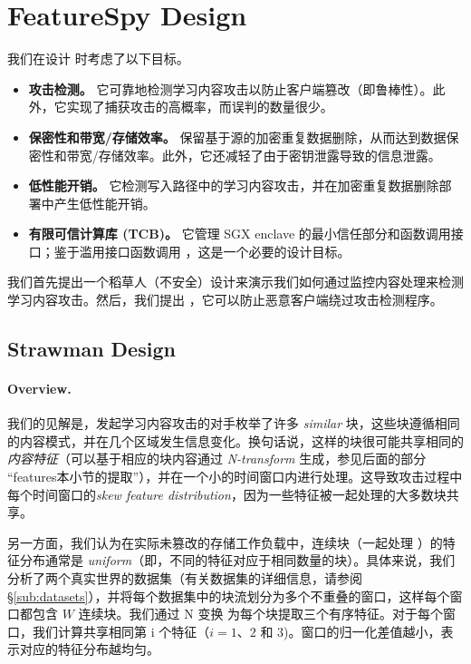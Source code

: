 \section{FeatureSpy Design}
\label{sec:design}
我们在设计 \sysnameF 时考虑了以下目标。

\begin{itemize}[leftmargin=*]
\item {\bf 攻击检测。} 它可靠地检测学习内容攻击以防止客户端篡改（即鲁棒性）。此外，它实现了捕获攻击的高概率，而误判的数量很少。
\item {\bf 保密性和带宽/存储效率。} 保留基于源的加密重复数据删除，从而达到数据保密性和带宽/存储效率。此外，它还减轻了由于密钥泄露导致的信息泄露。
\item {\bf 低性能开销。} 它检测写入路径中的学习内容攻击，并在加密重复数据删除部署中产生低性能开销。
\item {\bf 有限可信计算库 (TCB)。} 它管理 SGX enclave 的最小信任部分和函数调用接口；鉴于滥用接口函数调用 \cite{lie05}，这是一个必要的设计目标。
\end{itemize}

我们首先提出一个稻草人（不安全）设计来演示我们如何通过监控内容处理来检测学习内容攻击。然后，我们提出 \sysnameF，它可以防止恶意客户端绕过攻击检测程序。


\subsection{Strawman Design}
\label{sub:basic}
\paragraph{Overview.} 我们的见解是，发起学习内容攻击的对手枚举了许多 {\em similar} 块，这些块遵循相同的内容模式，并在几个区域发生信息变化。换句话说，这样的块很可能共享相同的 {\em 内容特征}（可以基于相应的块内容通过 {\em N-transform} \cite{shilane12} 生成，参见后面的部分 “features本小节的提取”），并在一个小的时间窗口内进行处理。这导致攻击过程中每个时间窗口的{\em skew feature distribution}，因为一些特征被一起处理的大多数块共享。

另一方面，我们认为在实际未篡改的存储工作负载中，连续块（一起处理 \cite{zhu08}）的特征分布通常是 {\em uniform}（即，不同的特征对应于相同数量的块）。具体来说，我们分析了两个真实世界的数据集（有关数据集的详细信息，请参阅 \S\ref{sub:datasets}），并将每个数据集中的块流划分为多个不重叠的窗口，这样每个窗口都包含 $W$ 连续块。我们通过 N 变换 \cite{shilane12} 为每个块提取三个有序特征。对于每个窗口，我们计算共享相同第 i 个特征（$ i=1、2$ 和 $3$)。窗口的归一化差值越小，表示对应的特征分布越均匀。


